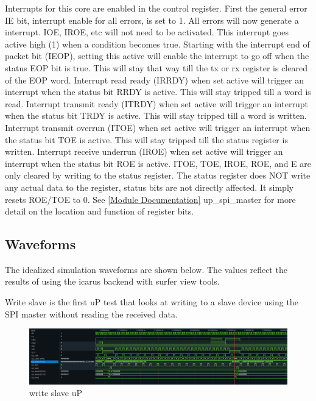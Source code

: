 \par
Interrupts for this core are enabled in the control register. First the general error IE bit, interrupt enable for all errors, is set to 1.
All errors will now generate a interrupt. IOE, IROE, etc will not need to be activated. This interrupt goes active high (1) when a condition becomes
true. Starting with the interrupt end of packet bit (IEOP), setting this active will enable the interrupt to go off when the status EOP bit
is true. This will stay that way till the tx or rx register is cleared of the EOP word. Interrupt read ready (IRRDY) when set active will trigger
an interrupt when the status bit RRDY is active. This will stay tripped till a word is read. Interrupt transmit ready (ITRDY) when set active will
trigger an interrupt when the status bit TRDY is active. This will stay tripped till a word is written. Interrupt transmit overrun (ITOE) when set
active will trigger an interrupt when the status bit TOE is active. This will stay tripped till the status register is written. Interrupt receive
underrun (IROE) when set active will trigger an interrupt when the status bit ROE is active. ITOE, TOE, IROE, ROE, and E are only cleared by writing to the
status register. The status register does NOT write any actual data to the register, status bits are not directly affected. It simply
resets ROE/TOE to 0. See \ref{Module Documentation} up\_spi\_master for more detail on the location and function of register bits.

\subsection{Waveforms}
The idealized simulation waveforms are shown below. The values reflect the results of using the icarus backend with surfer view tools.

\par
Write slave is the first uP test that looks at writing to a slave device using the SPI master without reading the received data.
\begin{figure}[H]
\caption{write slave uP}
\centering
\includegraphics[width=\textwidth]{img/diagrams/waveform_write_slave_up.png}
\end{figure}

